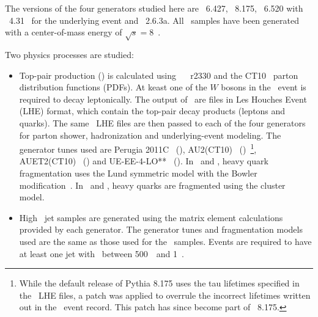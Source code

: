 
The versions of the four generators studied here are 
\PythiaS\ 6.427, 
\PythiaEE\ 8.175, 
\Herwig\ 6.520 
with \Jimmy\ 4.31~\cite{Butterworth:1996zw} for the underlying event and
\Herwigpp\ 2.6.3a.
All \pp\ samples have been generated with a center-of-mass energy of $\sqrt{s}=8$~\TeV.  

Two physics
processes are studied:
\begin{itemize}

  \item Top-pair production (\ttbar ) is calculated using  
\PowHeg\ ~\cite{Nason:2004rx, Frixione:2007vw, Alioli:2010xd, Alioli:2008gx} r2330 and
the \textsc{CT10}~\cite{Lai:2010vv} parton distribution functions (PDFs).  At keast one of the $W$ bosons in the \ttbar\ event is required to decay leptonically.
The output of \PowHeg\ are files in Les Houches Event (LHE) format, which contain the top-pair decay products (leptons and
quarks). The same 
\PowHeg\ LHE files are then passed to each of the four generators 
for parton shower, hadronization and underlying-event modeling.
The generator tunes used are
Perugia 2011C~\cite{Skands:2010ak} (\Pythia ),
AU2(CT10)~\cite{ATL-PHYS-PUB-2012-003} (\PythiaE )~\footnote{
While the default release of Pythia 8.175 uses the tau lifetimes specified in the \PowHeg\ LHE files, a patch was applied to overrule the incorrect lifetimes written out in the \PowHeg\ event record. This patch has since become part of \PythiaEE~8.175.},
AUET2(CT10)~\cite{ATL-PHYS-PUB-2011-008} (\Jimmy)
and UE-EE-4-LO**~\cite{Seymour:2013qka} (\Herwigpp ).  
In \Pythia\ and \PythiaE, heavy quark fragmentation uses the Lund symmetric model with
the Bowler modification~\cite{Bowler:1981sb}.  In \Herwig\ and \Herwigpp, heavy quarks are fragmented using the cluster model. 

\item High \pT~jet samples are generated using the matrix
element calculations provided by each generator.  The generator tunes and fragmentation models used are
the same as those used for the \ttbar\ samples. Events are required
to have at least one jet with \pT\ between 500~\GeV\ and 1~\TeV.

\end{itemize}


